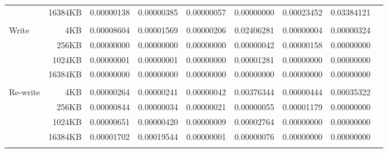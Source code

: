 \begin{table}[!htp]
\begin{tabular}{lrrrrrrrr}
&16384KB &\cellcolor[HTML]{f4c7c3}0.00000138 &\cellcolor[HTML]{f4c7c3}0.00000385 &\cellcolor[HTML]{f4c7c3}0.00000057 &\cellcolor[HTML]{f4c7c3}0.00000000 &\cellcolor[HTML]{f4c7c3}0.00023452 &\cellcolor[HTML]{f4c7c3}0.03384121 \\
& & & & & & & \\
\multirow{4}{*}{Write} &4KB &\cellcolor[HTML]{f4c7c3}0.00008604 &\cellcolor[HTML]{f4c7c3}0.00001569 &\cellcolor[HTML]{f4c7c3}0.00000206 &\cellcolor[HTML]{f4c7c3}0.02406281 &\cellcolor[HTML]{f4c7c3}0.00000004 &\cellcolor[HTML]{f4c7c3}0.00000324 \\
&256KB &\cellcolor[HTML]{f4c7c3}0.00000000 &\cellcolor[HTML]{f4c7c3}0.00000000 &\cellcolor[HTML]{f4c7c3}0.00000000 &\cellcolor[HTML]{f4c7c3}0.00000042 &\cellcolor[HTML]{f4c7c3}0.00000158 &\cellcolor[HTML]{f4c7c3}0.00000000 \\
&1024KB &\cellcolor[HTML]{f4c7c3}0.00000001 &\cellcolor[HTML]{f4c7c3}0.00000001 &\cellcolor[HTML]{f4c7c3}0.00000000 &\cellcolor[HTML]{f4c7c3}0.00001281 &\cellcolor[HTML]{f4c7c3}0.00000000 &\cellcolor[HTML]{f4c7c3}0.00000000 \\
&16384KB &\cellcolor[HTML]{f4c7c3}0.00000000 &\cellcolor[HTML]{f4c7c3}0.00000000 &\cellcolor[HTML]{f4c7c3}0.00000000 &\cellcolor[HTML]{f4c7c3}0.00000000 &\cellcolor[HTML]{f4c7c3}0.00000000 &\cellcolor[HTML]{f4c7c3}0.00000000 \\
& & & & & & & \\
\multirow{4}{*}{Re-write} &4KB &\cellcolor[HTML]{f4c7c3}0.00000264 &\cellcolor[HTML]{f4c7c3}0.00000241 &\cellcolor[HTML]{f4c7c3}0.00000042 &\cellcolor[HTML]{f4c7c3}0.00376344 &\cellcolor[HTML]{f4c7c3}0.00000444 &\cellcolor[HTML]{f4c7c3}0.00035322 \\
&256KB &\cellcolor[HTML]{f4c7c3}0.00000844 &\cellcolor[HTML]{f4c7c3}0.00000034 &\cellcolor[HTML]{f4c7c3}0.00000021 &\cellcolor[HTML]{f4c7c3}0.00000055 &\cellcolor[HTML]{f4c7c3}0.00001179 &\cellcolor[HTML]{f4c7c3}0.00000000 \\
&1024KB &\cellcolor[HTML]{f4c7c3}0.00000651 &\cellcolor[HTML]{f4c7c3}0.00000420 &\cellcolor[HTML]{f4c7c3}0.00000009 &\cellcolor[HTML]{f4c7c3}0.00002764 &\cellcolor[HTML]{f4c7c3}0.00000000 &\cellcolor[HTML]{f4c7c3}0.00000000 \\
&16384KB &\cellcolor[HTML]{f4c7c3}0.00001702 &\cellcolor[HTML]{f4c7c3}0.00019544 &\cellcolor[HTML]{f4c7c3}0.00000001 &\cellcolor[HTML]{f4c7c3}0.00000076 &\cellcolor[HTML]{f4c7c3}0.00000000 &\cellcolor[HTML]{f4c7c3}0.00000000 \\
& & & & & & & \\

\end{tabular}
\end{table}
